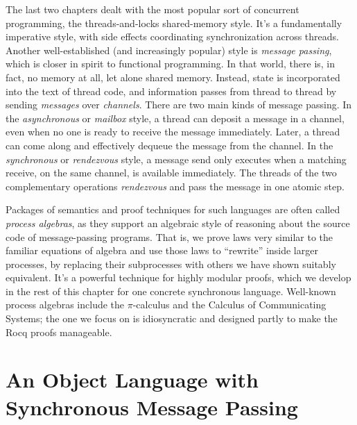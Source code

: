 \documentclass{amsbook}
\theoremstyle{definition}
\theoremstyle{remark}
\numberwithin{section}{chapter}
\numberwithin{equation}{chapter}
\begin{document}
The last two chapters dealt with the most popular sort of concurrent programming, the threads-and-locks shared-memory style.
It's a fundamentally imperative style, with side effects coordinating synchronization across threads.
Another well-established (and increasingly popular) style is \emph{message passing}, which is closer in spirit to functional programming.
In that world, there is, in fact, no memory at all, let alone shared memory.
Instead, state is incorporated into the text of thread code, and information passes from thread to thread by sending \emph{messages} over \emph{channels}.
There are two main kinds of message passing.
In the \emph{asynchronous} or \emph{mailbox} style, a thread can deposit a message in a channel, even when no one is ready to receive the message immediately.
Later, a thread can come along and effectively dequeue the message from the channel.
In the \emph{synchronous} or \emph{rendezvous} style, a message send only executes when a matching receive, on the same channel, is available immediately.
The threads of the two complementary operations \emph{rendezvous} and pass the message in one atomic step.

Packages of semantics and proof techniques for such languages are often called \emph{process algebras}, as they support an algebraic style of reasoning about the source code of message-passing programs.
That is, we prove laws very similar to the familiar equations of algebra and use those laws to ``rewrite'' inside larger processes, by replacing their subprocesses with others we have shown suitably equivalent.
It's a powerful technique for highly modular proofs, which we develop in the rest of this chapter for one concrete synchronous language.
Well-known process algebras include the $\pi$-calculus and the Calculus of Communicating Systems; the one we focus on is idiosyncratic and designed partly to make the Rocq proofs manageable.


\section{An Object Language with Synchronous Message Passing}

\newcommand{\newp}[3]{\nu[#1](#2); #3}
\newcommand{\block}[2]{\mt{block}(#1); #2}
\newcommand{\send}[3]{!#1(#2); #3}
\newcommand{\recv}[3]{?#1(#2); #3}
\newcommand{\parl}[2]{#1 || #2}
\newcommand{\dup}[1]{\mt{dup}(#1)}
\newcommand{\done}[0]{\mt{done}}
\end{document}
